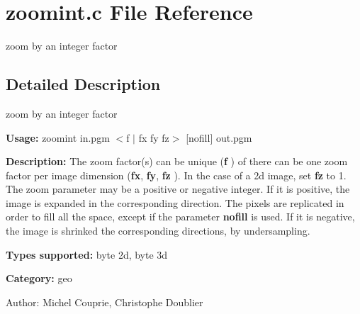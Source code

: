 \section{zoomint.c File Reference}
\label{zoomint_8c}
zoom by an integer factor  




\label{_details}
\subsection{Detailed Description}
zoom by an integer factor 

{\bf Usage:} zoomint in.pgm $<$f $|$ fx fy fz$>$ [nofill] out.pgm

{\bf Description:} The zoom factor(s) can be unique ({\bf f} ) of there can be one zoom factor per image dimension ({\bf fx}, {\bf fy}, {\bf fz} ). In the case of a 2d image, set {\bf fz} to 1. The zoom parameter may be a positive or negative integer. If it is positive, the image is expanded in the corresponding direction. The pixels are replicated in order to fill all the space, except if the parameter {\bf nofill} is used. If it is negative, the image is shrinked the corresponding directions, by undersampling.

{\bf Types supported:} byte 2d, byte 3d

{\bf Category:} geo

\begin{Desc}
\item[Author:]Michel Couprie, Christophe Doublier \end{Desc}
